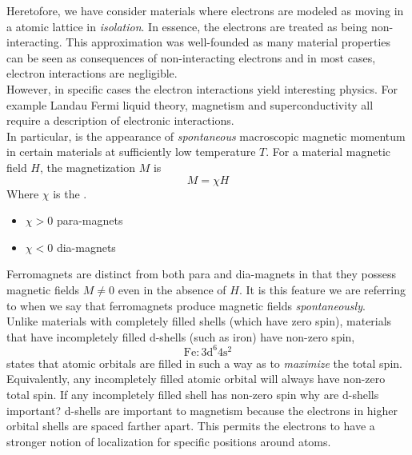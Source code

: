 \documentclass{article}
\begin{document}
Heretofore, we have consider materials where electrons are modeled as moving in a atomic lattice in \textit{isolation}. In essence, the electrons are treated as being non-interacting. This approximation was well-founded as many material properties can be seen as consequences of non-interacting electrons and in most cases, electron interactions are negligible. \\

However, in specific cases the electron interactions yield interesting physics. For example Landau Fermi liquid theory, magnetism and superconductivity all require a description of electronic interactions. \\

In particular,  is the appearance of \textit{spontaneous} macroscopic magnetic momentum in certain materials at sufficiently low temperature $T$. For a material magnetic field $H$, the magnetization $M$ is
\[ M = \chi H \]
Where $\chi$ is the .
\begin{itemize}
    \item $\chi > 0$ para-magnets
    \item $\chi < 0$ dia-magnets
\end{itemize}
Ferromagnets are distinct from both para and dia-magnets in that they possess magnetic fields $M \neq 0$ even in the absence of $H$. It is this feature we are referring to when we say that ferromagnets produce magnetic fields \textit{spontaneously}. \\

Unlike materials with completely filled shells (which have zero spin), materials that have incompletely filled d-shells (such as iron) have non-zero spin,
\[ \text{Fe} : 3 \text{d}^{6} 4\text{s}^2 \]
 states that atomic orbitals are filled in such a way as to \textit{maximize} the total spin. Equivalently, any incompletely filled atomic orbital will always have non-zero total spin. If any incompletely filled shell has non-zero spin why are d-shells important? d-shells are important to magnetism because the electrons in higher orbital shells are spaced farther apart. This permits the electrons to have a stronger notion of localization for specific positions around atoms. \\
\end{document}
